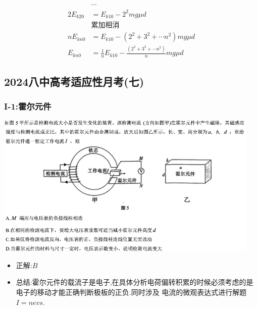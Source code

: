 \documentclass{article}
\begin{document}
\begin{itemize}
\begin{align*}
                                & \cdots                                                                                 \\
              2E_{k20}          & = E_{k10} - 2^{2} mg \mu d                                                             \\
                                & \text{累加相消}                                                                            \\
              n E_{kn0}         & = E_{k10} - (2^{2} + 3^{2} + \cdots n^{2}) mg \mu d                                    \\
              E_{kn0}           & = \frac{1}{n} E_{k10} - \frac{(2^{2} + 3^{2} + \cdots n^{2})}{n} mg \mu d
          \end{align*}

\end{itemize}

\vspace{2em}

\subsection{2024八中高考适应性月考(七)}
\subsubsection{I-1:霍尔元件}

\includegraphics[width=0.95\textwidth,keepaspectratio]{./pictures/3.3-1.png}


\begin{itemize}
    \item 正解:\quad $B$
    \item 总结:\quad 霍尔元件的载流子是电子,在具体分析电荷偏转积累的时候必须考虑的是电子的移动才能正确判断极板的正负.同时涉及
          电流的微观表达式进行解题$I = nevs$.
\end{itemize}
\end{document}
